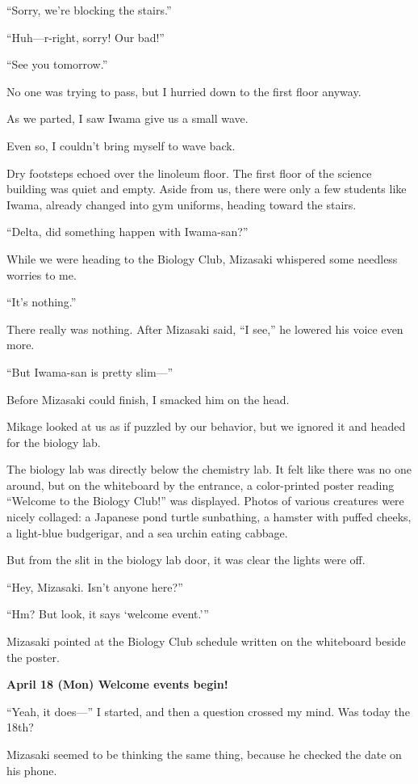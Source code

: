 \documentclass[
    a4paper,
    12pt,
    twoside,
    openany,
    UTF8,
    fontset=windows
]{ctexbook}
\begin{document}
``Sorry, we're blocking the stairs.''

``Huh---r-right, sorry! Our bad!''

``See you tomorrow.''

No one was trying to pass, but I hurried down to the first floor anyway.

As we parted, I saw Iwama give us a small wave.

Even so, I couldn't bring myself to wave back.

Dry footsteps echoed over the linoleum floor. The first floor of the science building was quiet and empty. Aside from us, there were only a few students like Iwama, already changed into gym uniforms, heading toward the stairs.

``Delta, did something happen with Iwama-san?''

While we were heading to the Biology Club, Mizasaki whispered some needless worries to me.

``It's nothing.''

There really was nothing. After Mizasaki said, ``I see,'' he lowered his voice even more.

``But Iwama-san is pretty slim---''

Before Mizasaki could finish, I smacked him on the head.

Mikage looked at us as if puzzled by our behavior, but we ignored it and headed for the biology lab.

The biology lab was directly below the chemistry lab. It felt like there was no one around, but on the whiteboard by the entrance, a color-printed poster reading ``Welcome to the Biology Club!'' was displayed. Photos of various creatures were nicely collaged: a Japanese pond turtle sunbathing, a hamster with puffed cheeks, a light-blue budgerigar, and a sea urchin eating cabbage.

But from the slit in the biology lab door, it was clear the lights were off.

``Hey, Mizasaki. Isn't anyone here?''

``Hm? But look, it says `welcome event.'''

Mizasaki pointed at the Biology Club schedule written on the whiteboard beside the poster.

\textbf{April 18 (Mon) Welcome events begin!}

``Yeah, it does---'' I started, and then a question crossed my mind. Was today the 18th?

Mizasaki seemed to be thinking the same thing, because he checked the date on his phone.
\end{document}
